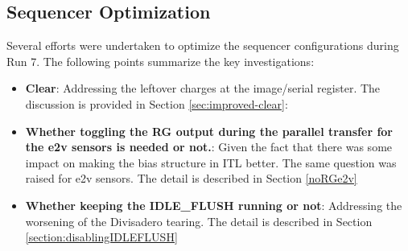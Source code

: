 \subsection{Sequencer Optimization}\label{sequencer-optimization}
Several efforts were undertaken to optimize the sequencer configurations during Run 7. The following points summarize the key investigations:

\begin{itemize}
\item {\bf Clear}: Addressing the leftover charges at the image/serial register. The discussion is provided in Section \ref{sec:improved-clear}:
%
%  
\item {\bf Whether toggling the RG output during the parallel transfer for the e2v sensors is needed or not.}: Given the fact that there was some impact on making the bias structure in ITL better. The same question was raised for e2v sensors. The detail is described in Section \ref{noRGe2v}
\item {\bf Whether keeping the IDLE\_FLUSH running or not}: Addressing the worsening of the Divisadero tearing. The detail is described in Section \ref{section:disablingIDLEFLUSH}

\end{itemize}
